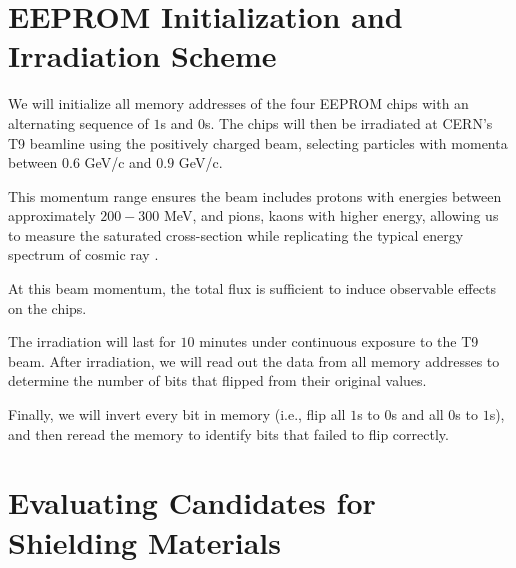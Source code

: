 \documentclass{article}
\begin{document}
\section*{EEPROM Initialization and Irradiation Scheme}

We will initialize all memory addresses of the four EEPROM chips with an alternating sequence of $1$s and $0$s. The chips will then be 
irradiated at CERN's T9 beamline using the positively charged beam, 
selecting particles with momenta between $0.6$ GeV/$\mathrm{c}$ and $0.9$ GeV/$\mathrm{c}$. 

This momentum range ensures the beam includes protons with energies between approximately 
$200-300$ MeV, and pions, kaons with higher energy, allowing us to measure the saturated cross-section while replicating the typical energy spectrum of cosmic ray
. 

At this beam momentum, the total flux is sufficient to induce observable effects on the chips. 

The irradiation will last for $10$ minutes under continuous exposure to the T9 beam. 
After irradiation, we will read out the data from all memory addresses to determine the number of bits that flipped from their original values.

Finally, we will invert every bit in memory (i.e., flip all $1$s to $0$s and all $0$s to $1$s), and then reread the memory
to identify bits that failed to flip correctly.

\section*{Evaluating Candidates for Shielding Materials}
\end{document}
